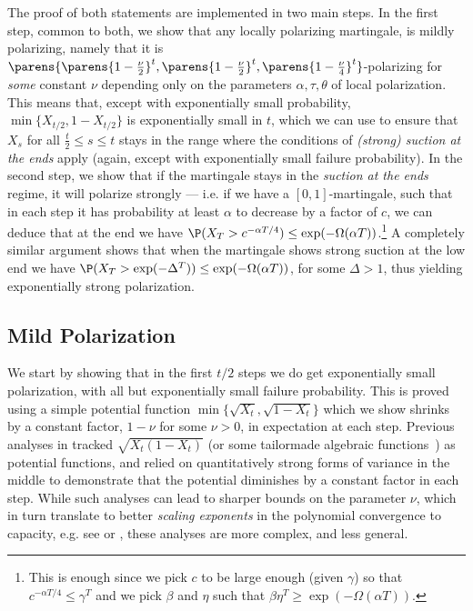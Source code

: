 \documentclass[11pt]{article}
\begin{document}
The proof of both statements are implemented in two main steps. In the first step, common to both,  we show that any locally polarizing martingale, is mildly polarizing, namely that it is $\parens{\parens{1 - \frac{\nu}{2}}^t, \parens{1 - \frac{\nu}{2}}^t, \parens{1 - \frac{\nu}{4}}^t}$-polarizing for \emph{some} constant $\nu$ depending only on the parameters $\alpha, \tau, \theta$ of local polarization. This means that, except with exponentially small probability, $\min\{X_{t/2}, 1- X_{t/2}\}$ is exponentially small in $t$, which we can use to ensure that $X_{s}$ for all $\frac{t}{2} \leq s \leq {t}$ stays in the range where the conditions of \emph{(strong) suction at the ends} apply (again, except with exponentially small failure probability). In the second step, we show that if the martingale stays in the \emph{suction at the ends} regime, it will polarize strongly --- i.e. if we have a $[0,1]$-martingale, such that in each step it has probability at least $\alpha$ to decrease by a factor of $c$, we can deduce that at the end we have $\P(X_T  > c^{-\alpha T/4}) \leq \exp(-\Omega(\alpha T))$.\footnote{This is enough since we pick $c$ to be large enough (given $\gamma$) so that $c^{-\alpha T/4}\le \gamma^T$ and we pick $\beta$ and $\eta$ such that $\beta\eta^T\ge \exp(-\Omega(\alpha T))$.} A completely similar argument shows that when the martingale shows strong suction at the low end we have  $\P(X_T  > \exp(-\Delta^T)) \leq \exp(-\Omega(\alpha T))$, for some $\Delta > 1$, thus yielding exponentially strong polarization.

\subsection{Mild Polarization}\label{ssec:local-to-mild}

We start by showing that in the first $t/2$ steps we do get exponentially small polarization, with all but exponentially small failure probability. This is proved using a simple potential function $\min\{\sqrt{X_t},\sqrt{1-X_t}\}$ which we show shrinks by a constant factor, $1- \nu$ for some $\nu > 0$, in expectation at each step. Previous analyses in \cite{GX15,GV15} tracked
$\sqrt{X_t(1-X_t)}$ (or some tailormade algebraic functions~\cite{HAU14,MHU16}) as potential functions, and relied on quantitatively strong forms of variance in the middle to demonstrate that the potential diminishes by a constant factor in each step.
While such analyses can lead to sharper bounds on the parameter $\nu$, which in turn translate to better \emph{scaling exponents} in the polynomial convergence to capacity, e.g. see \cite[Thm. 18]{HAU14} or \cite[Thm. 1]{MHU16}, these analyses are more complex, and less general.
\end{document}
